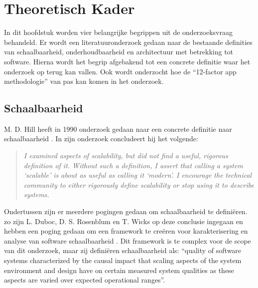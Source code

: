\chapter{Theoretisch Kader}
\label{Chapter2}

In dit hoofdstuk worden vier belangrijke begrippen uit de onderzoeksvraag behandeld. Er wordt een literatuuronderzoek gedaan naar de bestaande definities van schaalbaarheid, onderhoudbaarheid en architectuur met betrekking tot software. Hierna wordt het begrip afgebakend tot een concrete definitie waar het onderzoek op terug kan vallen. Ook wordt onderzocht hoe de \enquote{12-factor app methodologie} van pas kan komen in het onderzoek.

\section{Schaalbaarheid}

M. D. Hill heeft in 1990 onderzoek gedaan naar een concrete definitie naar schaalbaarheid \parencite{WhatIsScalability}. In zijn onderzoek concludeert hij het volgende:
\begin{quote}
	\textit{
		I examined aspects of scalability, but did not find a useful, rigorous definition of it. Without such a definition, I assert that calling a system ‘scalable’ is about as useful as calling it ‘modern’. I encourage the technical community to either rigorously define scalability or stop using it to describe systems.
	}
\end{quote}
Ondertussen zijn er meerdere pogingen gedaan om schaalbaarheid te definiëren. zo zijn L. Duboc, D. S. Rosenblum en T. Wicks op deze conclusie ingegaan en hebben een poging gedaan om een framework te creëren voor karakterisering en analyse van software schaalbaarheid \parencite{ScalabilityFramework}. Dit framework is te complex voor de scope van dit onderzoek, maar zij definiëren schaalbaarheid als: \enquote{quality of software systems characterized by the causal impact that scaling aspects of the system environment and design have on certain measured system qualities as these aspects are varied over expected operational ranges}.

